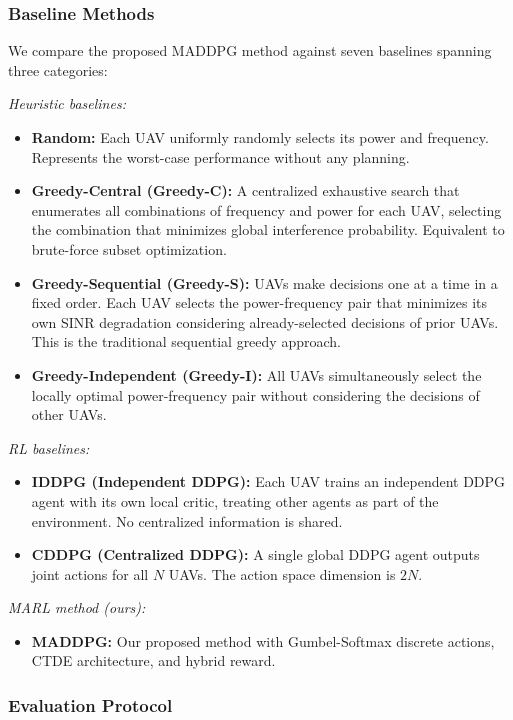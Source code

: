 \documentclass[conference]{IEEEtran}
\begin{document}
\subsubsection{Baseline Methods}

We compare the proposed MADDPG method against seven baselines spanning three categories:

\emph{Heuristic baselines:}
\begin{itemize}
    \item \textbf{Random:} Each UAV uniformly randomly selects its power and frequency. Represents the worst-case performance without any planning.
    \item \textbf{Greedy-Central (Greedy-C):} A centralized exhaustive search that enumerates all combinations of frequency and power for each UAV, selecting the combination that minimizes global interference probability. Equivalent to brute-force subset optimization.
    \item \textbf{Greedy-Sequential (Greedy-S):} UAVs make decisions one at a time in a fixed order. Each UAV selects the power-frequency pair that minimizes its own SINR degradation considering already-selected decisions of prior UAVs. This is the traditional sequential greedy approach.
    \item \textbf{Greedy-Independent (Greedy-I):} All UAVs simultaneously select the locally optimal power-frequency pair without considering the decisions of other UAVs.
\end{itemize}

\emph{RL baselines:}
\begin{itemize}
    \item \textbf{IDDPG (Independent DDPG):} Each UAV trains an independent DDPG agent with its own local critic, treating other agents as part of the environment. No centralized information is shared.
    \item \textbf{CDDPG (Centralized DDPG):} A single global DDPG agent outputs joint actions for all $N$ UAVs. The action space dimension is $2N$.
\end{itemize}

\emph{MARL method (ours):}
\begin{itemize}
    \item \textbf{MADDPG:} Our proposed method with Gumbel-Softmax discrete actions, CTDE architecture, and hybrid reward.
\end{itemize}

\subsubsection{Evaluation Protocol}
\end{document}

